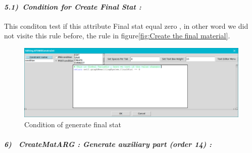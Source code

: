 \paragraph{\emph{5.1)~Condition for Create Final Stat : } } 
This conditon test if this attribute Final stat equal zero 
, in other word we did not visite this rule before, the rule in figure\ref{fig:Create the final material}.
 \vspace{1cm} 
\begin{figure}[th]
	\centering
 	\includegraphics[scale=0.37]{ch3/img/condfinal}
	\caption{\label{fig:Condition of generate final stat } Condition of generate final stat }
\end{figure} 

\paragraph{\emph{6)~ CreateMatARG : Generate auxiliary part  (order 14) :} }

